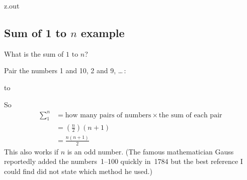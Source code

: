 \begin{VerbatimOut}{z.out}

\subsection{Sum of 1 to \(n\) example}

What is the sum of \(1 \text{ to } n\)?

Pair the numbers 1 and 10, 2 and 9, \ldots\,:

\hbox to

So
\begin{align}
  \sum_1^n &= \text{how many pairs of numbers}
    \times \text{the sum of each pair}\nonumber\\
  &= \left(\frac n 2\right) (n+1)\nonumber\\
  &= \frac {n (n+1)} 2
\end{align}
This also works if \(n\) is an odd number.
(The famous mathematician Gauss reportedly added
the numbers~1--100 quickly in~1784
but the best reference I could find
\cite[page 3--4]{waltershausen1856}                                             
did not state which method he used.)
\end{VerbatimOut}

\MyIO


